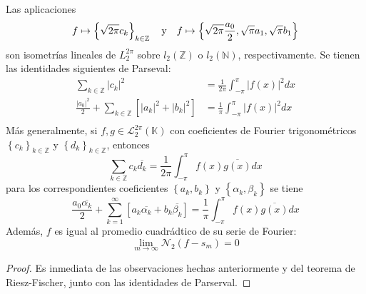 \documentclass[12pt]{report}
\newcounter{it}
\theoremstyle{largebreak}
\newcommand\abs[1]{\ensuremath{\left|#1\right|}}
\newcommand{\N}[2]{\ensuremath{\mathcal{N}_{#1}\left(#2\right)}}
\begin{document}
    \begin{theor}
        Las aplicaciones
        \begin{equation*}
            f\mapsto \left\{\sqrt{2\pi}c_k \right\}_{k\in\mathbb{Z}}\quad\textup{y}\quad f\mapsto\left\{\sqrt{2\pi}\frac{a_0}{2},\sqrt{\pi}a_1,\sqrt{\pi}b_1 \right\}
        \end{equation*}
        son isometrías lineales de $L_2^{2\pi}$ sobre $l_2(\mathbb{Z})$ o $l_2(\mathbb{N})$, respectivamente. Se tienen las identidades siguientes de Parseval:
        \begin{equation*}
            \begin{split}
                \sum_{ k\in\mathbb{Z}}\abs{c_k}^2&=\frac{1}{2\pi}\int_{-\pi}^{\pi}\abs{f(x)}^2dx\\
                \frac{\abs{a_0}^2}{2}+\sum_{ k\in\mathbb{Z}}\left[\abs{a_k}^2+\abs{b_k}^2 \right]&=\frac{1}{\pi}\int_{-\pi}^{\pi}\abs{f(x)}^2dx\\
            \end{split}
        \end{equation*}
        Más generalmente, si $f,g\in\mathcal{L}_2^{2\pi}(\mathbb{K})$ con coeficientes de Fourier trigonométricos $\left\{c_k \right\}_{k\in\mathbb{Z}}$ y $\left\{d_k \right\}_{k\in\mathbb{Z}}$, entonces
        \begin{equation*}
            \sum_{ k\in\mathbb{Z}}c_k\overline{d_k}=\frac{1}{2\pi}\int_{-\pi}^{\pi}f(x)\overline{g(x)}dx
        \end{equation*}
        para los correspondientes coeficientes $\left\{a_k,b_k \right\}$ y  $\left\{\alpha_k,\beta_k \right\}$ se tiene
        \begin{equation*}
            \frac{a_0\overline{\alpha_k}}{2}+\sum_{ k=1}^\infty\left[a_k\overline{\alpha_k}+b_k\overline{\beta_k} \right]=\frac{1}{\pi}\int_{-\pi}^{\pi}f(x)\overline{g(x)}dx
        \end{equation*}
        Además, $f$ es igual al promedio cuadrádtico de su serie de Fourier:
        \begin{equation*}
            \lim_{ m\rightarrow\infty}\N{2}{f-s_m}=0
        \end{equation*}
    \end{theor}
    
    \begin{proof}
        Es inmediata de las observaciones hechas anteriormente y del teorema de Riesz-Fischer, junto con las identidades de Parserval.
    \end{proof}
\end{document}

